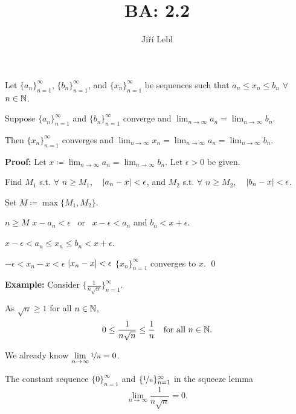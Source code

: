 \documentclass[10pt,aspectratio=149]{beamer}
\author{Ji\v{r}\'i Lebl}
\institute[OSU]{%
Departemento pri Matematiko de Oklahoma {\^S}tata Universitato}
\title{BA: 2.2}
\date{}
\begin{document}
\begin{frame}
\titlepage
\end{frame}

\begin{frame}
\begin{lemma}
Let $\{ a_n \}_{n=1}^\infty$, 
$\{ b_n \}_{n=1}^\infty$, and 
$\{ x_n \}_{n=1}^\infty$ be sequences such that
\quad
$a_n \leq x_n \leq b_n$ \quad $\forall$ $n \in {\mathbb{N}}$.
\pause

Suppose $\{ a_n \}_{n=1}^\infty$ and $\{ b_n \}_{n=1}^\infty$ converge and
\quad
$\displaystyle
\lim_{n\to \infty} a_n
=
\lim_{n\to \infty} b_n$.

\pause
Then $\{ x_n \}_{n=1}^\infty$ converges and
\quad
$\displaystyle
\lim_{n\to \infty} x_n
=
\lim_{n\to \infty} a_n
=
\lim_{n\to \infty} b_n$.
\end{lemma}

\pause
\textbf{Proof:}
Let $\displaystyle x \coloneqq \lim_{n\to\infty} a_n = \lim_{n\to\infty} b_n$.
\pause
Let $\epsilon > 0$ be given.

\pause
Find $M_1$ s.t. $\forall$ $n \geq M_1$, ~
$\left\lvert {a_n-x} \right\rvert < \epsilon$,
\pause
and $M_2$  s.t. $\forall$ $n \geq M_2$,
~ $\left\lvert {b_n-x} \right\rvert < \epsilon$.

\pause
Set $M \coloneqq \max \{M_1, M_2 \}$.

\pause
$n \geq M$
\wthus
$x - a_n < \epsilon$ ~or~ $x - \epsilon < a_n$ \quad
\pause
 and \quad  $b_n < x + \epsilon$.

\pause
\thus \quad
$x - \epsilon < a_n \leq x_n \leq b_n < x + \epsilon$.

\pause
\thus \quad $-\epsilon < x_n-x < \epsilon$
\pause
\wthus $\left\lvert {x_n-x} \right\rvert < \epsilon$
\pause
\wthus
$\{x_n\}_{n=1}^\infty$ converges to $x$.
\qed

\pause
\medskip

\begin{center}
\end{center}

\end{frame}

\begin{frame}

\textbf{Example:}
Consider $\bigl\{ \frac{1}{n\sqrt{n}} \bigr\}_{n=1}^\infty$.

\pause
\medskip

As $\sqrt{n} \geq 1$ for all $n \in {\mathbb{N}}$,
\begin{equation*}
0 \leq \frac{1}{n\sqrt{n}} \leq \frac{1}{n}
\quad \text{for all } n \in {\mathbb{N}}.
\end{equation*}

\pause

We already know $\displaystyle \lim_{n \to \infty} \nicefrac{1}{n} = 0$. 

\medskip
\pause

The constant sequence $\{ 0 \}_{n=1}^\infty$ and $\{ \nicefrac{1}{n}
\}_{n=1}^\infty$ in the
squeeze lemma \quad \thus
\begin{equation*}
\lim_{n\to\infty} \frac{1}{n\sqrt{n}} = 0 .
\end{equation*}

\end{frame}
\end{document}
